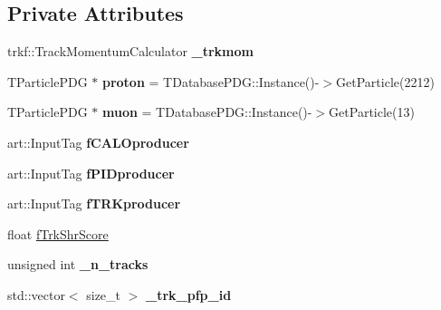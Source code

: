\subsection*{Private Attributes}
\begin{DoxyCompactItemize}
\item 
\hypertarget{classanalysis_1_1TrackAnalysis_aa69136b70c77e0f034fe009b86ba591b}{trkf\-::\-Track\-Momentum\-Calculator {\bfseries \-\_\-trkmom}}\label{classanalysis_1_1TrackAnalysis_aa69136b70c77e0f034fe009b86ba591b}

\item 
\hypertarget{classanalysis_1_1TrackAnalysis_a4adc7f89c334ab93747a8d4c4abbcc6d}{T\-Particle\-P\-D\-G $\ast$ {\bfseries proton} = T\-Database\-P\-D\-G\-::\-Instance()-\/$>$Get\-Particle(2212)}\label{classanalysis_1_1TrackAnalysis_a4adc7f89c334ab93747a8d4c4abbcc6d}

\item 
\hypertarget{classanalysis_1_1TrackAnalysis_a0fe3b9e7864aaaa36b5f52826b4e3eb9}{T\-Particle\-P\-D\-G $\ast$ {\bfseries muon} = T\-Database\-P\-D\-G\-::\-Instance()-\/$>$Get\-Particle(13)}\label{classanalysis_1_1TrackAnalysis_a0fe3b9e7864aaaa36b5f52826b4e3eb9}

\item 
\hypertarget{classanalysis_1_1TrackAnalysis_a0ceaf940b041eda0237cc73cd330d18d}{art\-::\-Input\-Tag {\bfseries f\-C\-A\-L\-Oproducer}}\label{classanalysis_1_1TrackAnalysis_a0ceaf940b041eda0237cc73cd330d18d}

\item 
\hypertarget{classanalysis_1_1TrackAnalysis_a349dc117e508190c619cd9f47ea7647e}{art\-::\-Input\-Tag {\bfseries f\-P\-I\-Dproducer}}\label{classanalysis_1_1TrackAnalysis_a349dc117e508190c619cd9f47ea7647e}

\item 
\hypertarget{classanalysis_1_1TrackAnalysis_a45abdcf3140e68a2ce90501e33a00eb3}{art\-::\-Input\-Tag {\bfseries f\-T\-R\-Kproducer}}\label{classanalysis_1_1TrackAnalysis_a45abdcf3140e68a2ce90501e33a00eb3}

\item 
float \hyperlink{classanalysis_1_1TrackAnalysis_a49502213574f13be542aaab647940ffd}{f\-Trk\-Shr\-Score}
\item 
\hypertarget{classanalysis_1_1TrackAnalysis_a965f2969aac19332af4597a364586c5d}{unsigned int {\bfseries \-\_\-n\-\_\-tracks}}\label{classanalysis_1_1TrackAnalysis_a965f2969aac19332af4597a364586c5d}

\item 
\hypertarget{classanalysis_1_1TrackAnalysis_a6ff6b242cbf5345bc77a2a574218ccd9}{std\-::vector$<$ size\-\_\-t $>$ {\bfseries \-\_\-trk\-\_\-pfp\-\_\-id}}\label{classanalysis_1_1TrackAnalysis_a6ff6b242cbf5345bc77a2a574218ccd9}


\end{DoxyCompactItemize}
